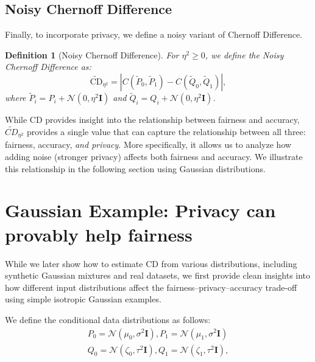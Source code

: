 \documentclass[11pt,letterpaper]{article}
\newtheorem{definition}{Definition}
\begin{document}
\subsection{Noisy Chernoff Difference}


Finally, to incorporate privacy, we define a noisy variant of Chernoff Difference.

\begin{definition}[Noisy Chernoff Difference] \label{def:GNCD}
     For $\eta^2\geq 0$, we define the Noisy Chernoff Difference as:
    \begin{equation}
        \widetilde{\text{CD}}_{\eta^2} = \left|C(\widetilde{P}_0, \widetilde{P}_1) - C(\widetilde{Q}_0, \widetilde{Q}_1)\right|,
    \end{equation}
     where $\widetilde{P}_i = P_i + \mathcal{N}(0, \eta^2\mathbf{I})$ and $\widetilde{Q}_i = Q_i + \mathcal{N}(0, \eta^2\mathbf{I})$.

    
\end{definition}


While CD provides insight into the relationship between fairness and accuracy, $\widetilde{CD}_{\eta^2}$ provides a single value that can capture the relationship between all three: fairness, accuracy, \textit{and privacy}. More specifically, it allows us to analyze how adding noise (stronger privacy) affects both fairness and accuracy. We illustrate this relationship in the following section using Gaussian distributions.


\section{Gaussian Example: Privacy can provably help fairness}\label{sec:chernoff_info}





While we later show how to estimate CD from various distributions, including synthetic Gaussian mixtures and real datasets, we first provide clean insights into how different input distributions affect the fairness–privacy–accuracy trade-off using simple isotropic Gaussian examples. 

We define the conditional data distributions as follows:
 \begin{align}
     P_0 = \mathcal{N}(\mu_0, \sigma^2\mathbf{I}), 
     P_1 = \mathcal{N}(\mu_1, \sigma^2\mathbf{I}) \\ Q_0 = \mathcal{N}(\zeta_0, \tau^2\mathbf{I}), Q_1 = \mathcal{N}(\zeta_1, \tau^2\mathbf{I}),
 \end{align}  
\end{document}

